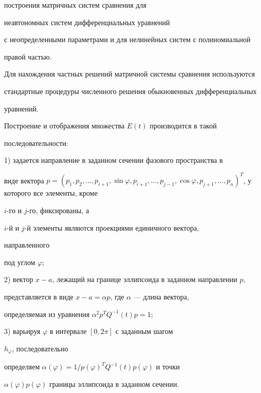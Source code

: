 построения матричных систем сравнения для 


неавтономных систем дифференциальных уравнений 


с неопределенными параметрами и для нелинейных систем с полиномиальной 


правой частью. 


 


Для нахождения частных решений матричной системы сравнения используются 


стандартные процедуры численного решения обыкновенных дифференциальных 


уравнений. 


 


Построение и отображения множества $E(t)$ производится в такой 


последовательности: 


 


1) задается направление в заданном сечении фазового пространства в 


виде вектора $p=(p_1,p_2,\dotsc,p_{i+1},\sin\varphi, p_{i+1},\dotsc, 


p_{j-1},\cos\varphi, p_{j+1},\dotsc,p_n)^T$, у которого все элементы, кроме 


$i$-го и $j$-го, фиксированы, а 


$i$-й и $j$-й элементы являются проекциями единичного вектора, 


направленного 


под углом $\varphi$; 


 


2) вектор $x-a$, лежащий на границе эллипсоида в заданном направлении $p$, 


представляется в виде $x-a=\alpha p$, где $\alpha$ --- длина вектора, 


определяемая из уравнения $\alpha^2p^T Q^{-1}(t)p=1$; 


 


3) варьируя $\varphi$ в интервале $[0,2\pi]$ с заданным шагом 


$h_\varphi$, последовательно 


определяем $\alpha(\varphi)=1/p(\varphi)^T Q^{-1}(t)p(\varphi)$ и точки 


$\alpha(\varphi)p(\varphi)$ границы эллипсоида в заданном сечении. 


